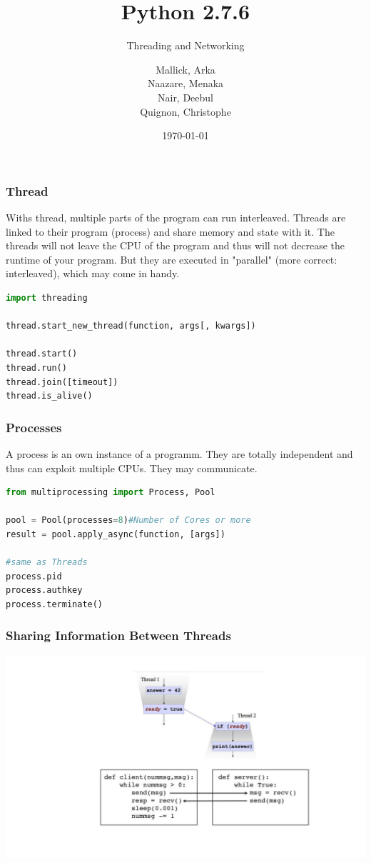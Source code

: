 \documentclass{beamer}
\begin{document}
\title{Python 2.7.6}
\subtitle{Threading and Networking}
\author{
  Mallick, Arka\\
  Naazare, Menaka \\
  Nair, Deebul\\
  Quignon, Christophe \\
} 
\date{\today}

\begin{frame}
\titlepage
\end{frame}

\begin{frame}[fragile]
\frametitle{Thread}
Withs thread, multiple parts of the program can run interleaved. Threads are linked to their program (process) and share memory and state with it.
The threads will not leave the CPU of the program and thus will not decrease the runtime of your program. But they are executed in "parallel" (more correct: interleaved), which may come in handy.


\begin{lstlisting}[language=Python]
import threading

thread.start_new_thread(function, args[, kwargs])

thread.start()
thread.run()
thread.join([timeout])
thread.is_alive()
\end{lstlisting}
\end{frame}

\begin{frame}[fragile]
\frametitle{Processes}
A process is an own instance of a programm. They are totally independent and thus can exploit multiple CPUs. They may communicate. 

\begin{lstlisting}[language=Python]
from multiprocessing import Process, Pool

pool = Pool(processes=8)#Number of Cores or more
result = pool.apply_async(function, [args])

#same as Threads
process.pid
process.authkey
process.terminate()
\end{lstlisting}
\end{frame}


\begin{frame}[fragile]
\frametitle{Sharing Information Between Threads}
\includegraphics[width=\linewidth]{datashare}
\end{frame}
\end{document}
